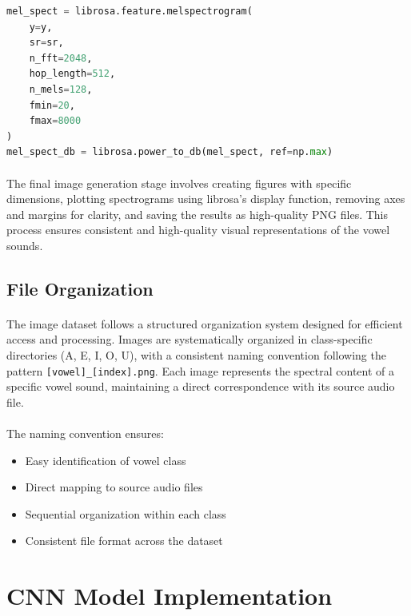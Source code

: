 \begin{lstlisting}[language=Python, caption={Spectrogram Generation Code}]
mel_spect = librosa.feature.melspectrogram(
    y=y,
    sr=sr,
    n_fft=2048,
    hop_length=512,
    n_mels=128,
    fmin=20,
    fmax=8000
)
mel_spect_db = librosa.power_to_db(mel_spect, ref=np.max)
\end{lstlisting}

\paragraph{}
The final image generation stage involves creating figures with specific dimensions, plotting spectrograms using librosa's display function, removing axes and margins for clarity, and saving the results as high-quality PNG files. This process ensures consistent and high-quality visual representations of the vowel sounds.

\subsection{File Organization}
\label{subsec:image-organization}

\paragraph{}
The image dataset follows a structured organization system designed for efficient access and processing. Images are systematically organized in class-specific directories (A, E, I, O, U), with a consistent naming convention following the pattern \texttt{[vowel]\_[index].png}. Each image represents the spectral content of a specific vowel sound, maintaining a direct correspondence with its source audio file.

\paragraph{}
The naming convention ensures:
\begin{itemize}
    \item Easy identification of vowel class
    \item Direct mapping to source audio files
    \item Sequential organization within each class
    \item Consistent file format across the dataset
\end{itemize}

\section{CNN Model Implementation}
\label{sec:cnn-implementation}

